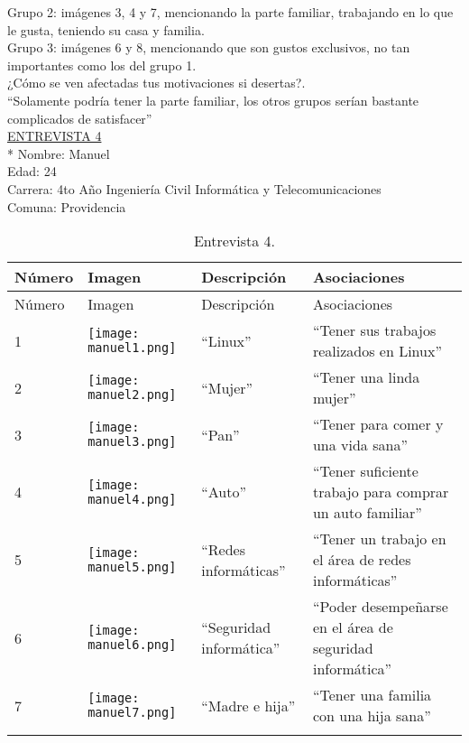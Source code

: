 Grupo 2: imágenes 3, 4 y 7, mencionando la parte familiar, trabajando en lo que le gusta, teniendo su casa y familia.\\

Grupo 3: imágenes 6 y 8, mencionando que son gustos exclusivos, no tan importantes como los del grupo 1.\\

¿Cómo se ven afectadas tus motivaciones si desertas?.\\

``Solamente podría tener la parte familiar, los otros grupos serían bastante complicados de satisfacer''\\


\underline {ENTREVISTA 4} \\*
Nombre: Manuel\\
Edad: 24\\
Carrera: 4to Año Ingeniería Civil Informática y Telecomunicaciones\\
Comuna: Providencia\\

\begin{longtable}{>{\centering\arraybackslash}m{1cm} >{\centering\arraybackslash}m{2cm} >{\arraybackslash}m{5cm}>{\arraybackslash}m{5cm}}
	
	\hline
	Número & Imagen & Descripción & Asociaciones \\
	\hline \hline
	\endfirsthead
	
	\hline
	Número & Imagen & Descripción & Asociaciones \\
	\hline \hline
	\endhead

1 & \texttt{[image: manuel1.png]} & ``Linux'' & ``Tener sus trabajos realizados en Linux''\\
\hline

2 & \texttt{[image: manuel2.png]} & ``Mujer'' & ``Tener una linda mujer''\\
\hline

3 & \texttt{[image: manuel3.png]} & ``Pan'' & ``Tener para comer y una vida sana'' \\
\hline

4 & \texttt{[image: manuel4.png]} & ``Auto'' & ``Tener suficiente trabajo para comprar un auto familiar'' \\
\hline

5 & \texttt{[image: manuel5.png]} & ``Redes informáticas'' & ``Tener un trabajo en el área de redes informáticas'' \\
\hline

6 & \texttt{[image: manuel6.png]} & ``Seguridad informática'' & ``Poder desempeñarse en el área de seguridad informática'' \\
\hline

7 & \texttt{[image: manuel7.png]} & ``Madre e hija'' & ``Tener una familia con una hija sana'' \\
\hline


\caption{Entrevista 4.}
\label{tabla:manuel}
\end{longtable}

